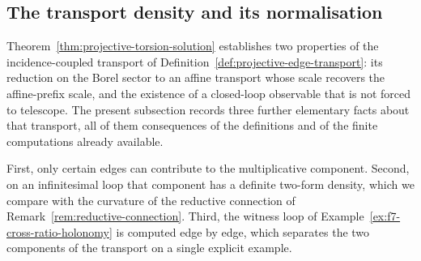 %
%
%
%

\subsection{The transport density and its normalisation}
\label{subsec:transport-density}

Theorem~\ref{thm:projective-torsion-solution} establishes two properties of the
incidence-coupled transport of
Definition~\ref{def:projective-edge-transport}: its reduction on the Borel sector
to an affine transport whose scale recovers the affine-prefix scale, and the
existence of a closed-loop observable that is not forced to telescope.  The present subsection records three further
elementary facts about that transport, all of them consequences of the
definitions and of the finite computations already available.

First, only certain edges can contribute to the multiplicative component.
Second, on an infinitesimal loop that component has a definite two-form density,
which we compare with the curvature of the reductive connection of
Remark~\ref{rem:reductive-connection}.  Third, the witness loop of
Example~\ref{ex:f7-cross-ratio-holonomy} is computed edge by edge, which
separates the two components of the transport on a single explicit example.


